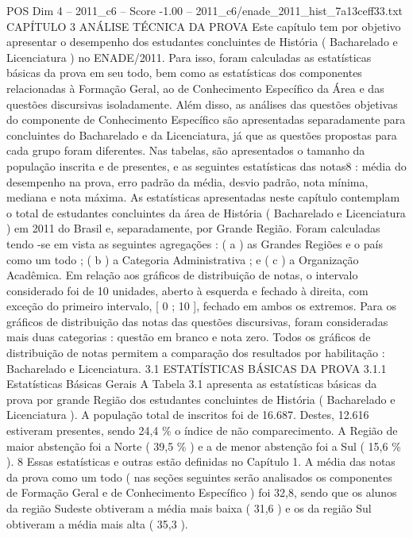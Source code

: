 \begin{textsample}{POS Dim 4 – 2011\_c6 – Score -1.00 – 2011\_c6/enade\_2011\_hist\_7a13ceff33.txt}  \label{ex:f4_pos_306}
CAPÍTULO 3 ANÁLISE TÉCNICA DA PROVA Este capítulo tem por objetivo apresentar o desempenho dos estudantes concluintes de História ( Bacharelado e Licenciatura ) no ENADE/2011.
Para isso, foram calculadas as estatísticas básicas da prova em seu todo, bem como as estatísticas dos componentes relacionadas à Formação Geral, ao de Conhecimento Específico da Área e das questões discursivas isoladamente.
Além disso, as análises das questões objetivas do componente de Conhecimento Específico são apresentadas separadamente para concluintes do Bacharelado e da Licenciatura, já que as questões propostas para cada grupo foram diferentes.
Nas tabelas, são apresentados o tamanho da população inscrita e de presentes, e as seguintes estatísticas das notas8 : média do desempenho na prova, erro padrão da média, desvio padrão, nota mínima, mediana e nota máxima.
As estatísticas apresentadas neste capítulo contemplam o total de estudantes concluintes da área de História ( Bacharelado e Licenciatura ) em 2011 do Brasil e, separadamente, por Grande Região.
Foram calculadas tendo -se em vista as seguintes agregações : ( a ) as Grandes Regiões e o país como um todo ; ( b ) a Categoria Administrativa ; e ( c ) a Organização Acadêmica.
Em relação aos gráficos de distribuição de notas, o intervalo considerado foi de 10 unidades, aberto à esquerda e fechado à direita, com exceção do primeiro intervalo, [ 0 ; 10 ], fechado em ambos os extremos.
Para os gráficos de distribuição das notas das questões discursivas, foram consideradas mais duas categorias : questão em branco e nota zero.
Todos os gráficos de distribuição de notas permitem a comparação dos resultados por habilitação : Bacharelado e Licenciatura. 3.1 ESTATÍSTICAS BÁSICAS DA PROVA 3.1.1 Estatísticas Básicas Gerais A Tabela 3.1 apresenta as estatísticas básicas da prova por grande Região dos estudantes concluintes de História ( Bacharelado e Licenciatura ).
A população total de inscritos foi de 16.687.
Destes, 12.616 estiveram presentes, sendo 24,4 \% o índice de não comparecimento.
A Região de maior abstenção foi a Norte ( 39,5 \% ) e a de menor abstenção foi a Sul ( 15,6 \% ). 8 Essas estatísticas e outras estão definidas no Capítulo 1.
A média das notas da prova como um todo ( nas seções seguintes serão analisados os componentes de Formação Geral e de Conhecimento Específico ) foi 32,8, sendo que os alunos da região Sudeste obtiveram a média mais baixa ( 31,6 ) e os da região Sul obtiveram a média mais alta ( 35,3 ).

\end{textsample}
